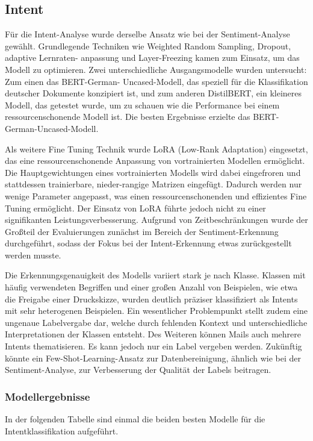 \subsection{Intent} 
Für die Intent-Analyse wurde derselbe Ansatz wie bei der Sentiment-Analyse gewählt. 
Grundlegende Techniken wie Weighted Random Sampling, Dropout, adaptive Lernraten- anpassung 
und Layer-Freezing kamen zum Einsatz, um das Modell zu optimieren. Zwei unterschiedliche 
Ausgangsmodelle wurden untersucht: Zum einen das BERT-German- Uncased-Modell, das speziell 
für die Klassifikation deutscher Dokumente konzipiert ist, und zum anderen DistilBERT, 
ein kleineres Modell, das getestet wurde, um zu schauen wie die Performance bei einem 
ressourcenschonende Modell ist. Die besten Ergebnisse erzielte das BERT-German-Uncased-Modell. 

Als weitere Fine Tuning Technik wurde LoRA (Low-Rank Adaptation) eingesetzt, das eine 
ressourcenschonende Anpassung von vortrainierten Modellen ermöglicht. Die Hauptgewichtungen 
eines vortrainierten Modells wird dabei eingefroren und stattdessen trainierbare, nieder-rangige Matrizen 
eingefügt. Dadurch werden nur wenige Parameter angepasst, was einen ressourcenschonenden und effizientes 
Fine Tuning ermöglicht. Der Einsatz von LoRA führte jedoch nicht zu einer signifikanten 
Leistungsverbesserung. Aufgrund von Zeitbeschränkungen wurde der Großteil der Evaluierungen zunächst 
im Bereich der Sentiment-Erkennung durchgeführt, sodass der Fokus bei der Intent-Erkennung etwas 
zurückgestellt werden musste. 

Die Erkennungsgenauigkeit des Modells variiert stark je nach Klasse. Klassen mit häufig verwendeten 
Begriffen und einer großen Anzahl von Beispielen, wie etwa die Freigabe einer Druckskizze, 
wurden deutlich präziser klassifiziert als Intents mit sehr heterogenen Beispielen. 
Ein wesentlicher Problempunkt stellt zudem eine ungenaue Labelvergabe dar, welche durch 
fehlenden Kontext und unterschiedliche Interpretationen der Klassen entsteht. Des Weiteren können 
Mails auch mehrere Intents thematisieren. Es kann jedoch nur ein Label vergeben werden. 
Zukünftig könnte ein Few-Shot-Learning-Ansatz zur Datenbereinigung, ähnlich wie bei der 
Sentiment-Analyse, zur Verbesserung der Qualität der Labels beitragen. 

\subsubsection{Modellergebnisse}
In der folgenden Tabelle sind einmal die beiden besten Modelle für die Intentklassifikation
aufgeführt. 

